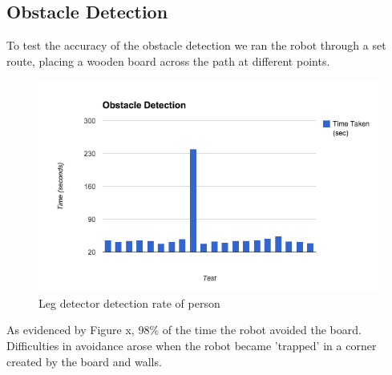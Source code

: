 \documentclass{article}
\begin{document}
\begin{multicols}{2}
	\subsection{Obstacle Detection}
	To test the accuracy of the obstacle detection we ran the robot through a set route, placing a wooden board across the path at different points.
	\begin{figure}[H]
	\centering
	\includegraphics[width=\linewidth]{ExperimentalResults12}
	\caption{Leg detector detection rate of person}
	\end{figure}
	As evidenced by Figure x, 98\% of the time the robot avoided the board. Difficulties in avoidance arose when the robot became 'trapped' in a corner created by the board and walls.
	

\end{multicols}
\end{document}
